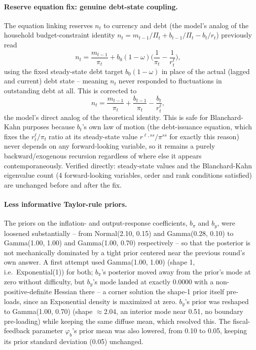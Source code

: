 \documentclass[11pt]{article}
\begin{document}
\paragraph{Reserve equation fix: genuine debt-state coupling.} The
equation linking reserves $n_t$ to currency and debt (the model's analog
of the household budget-constraint identity $n_t = m_{t-1}/\Pi_t +
b_{t-1}/\Pi_t - b_t/r_t$) previously read
\[
n_t = \frac{m_{t-1}}{\pi_t} + b_0(1-\omega)\Big(\frac{1}{\pi_t}-\frac{1}{r^\ell_t}\Big),
\]
using the fixed steady-state debt target $b_0(1-\omega)$ in place of the
actual (lagged and current) debt state -- meaning $n_t$ never responded
to fluctuations in outstanding debt at all. This is corrected to
\[
n_t = \frac{m_{t-1}}{\pi_t} + \frac{b_{t-1}}{\pi_t} - \frac{b_t}{r^\ell_t},
\]
the model's direct analog of the theoretical identity. This is safe for
Blanchard-Kahn purposes because $b_t$'s own law of motion (the
debt-issuance equation, which fixes the $r^\ell_t/\pi_t$ ratio at its
steady-state value $r^{\ell,ss}/\pi^{ss}$ for exactly this reason) never
depends on any forward-looking variable, so it remains a purely
backward/exogenous recursion regardless of where else it appears
contemporaneously. Verified directly: steady-state values and the
Blanchard-Kahn eigenvalue count (4 forward-looking variables, order and
rank conditions satisfied) are unchanged before and after the fix.

\paragraph{Less informative Taylor-rule priors.} The priors on the
inflation- and output-response coefficients, $b_\pi$ and $b_y$, were
loosened substantially -- from Normal(2.10, 0.15) and Gamma(0.28, 0.10)
to Gamma(1.00, 1.00) and Gamma(1.00, 0.70) respectively -- so that the
posterior is not mechanically dominated by a tight prior centered near
the previous round's own answer. A first attempt used Gamma(1.00, 1.00)
(shape 1, i.e.\ Exponential(1)) for both; $b_\pi$'s posterior moved away
from the prior's mode at zero without difficulty, but $b_y$'s mode
landed at exactly 0.0000 with a non-positive-definite Hessian there --
a corner solution the shape-1 prior itself pre-loads, since an
Exponential density is maximized at zero. $b_y$'s prior was reshaped to
Gamma(1.00, 0.70) (shape $\approx$2.04, an interior mode near 0.51, no
boundary pre-loading) while keeping the same diffuse mean, which
resolved this. The fiscal-feedback parameter $\varphi_b$'s prior mean
was also lowered, from 0.10 to 0.05, keeping its prior standard
deviation (0.05) unchanged.
\end{document}
